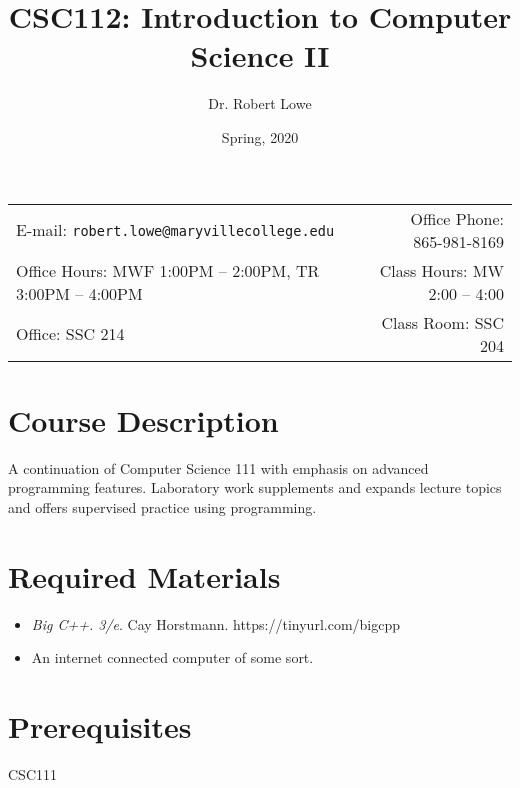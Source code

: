 \documentclass[11pt]{article}
\title{CSC112: Introduction to Computer Science II}
\author{Dr. Robert Lowe}
\date{Spring, 2020}
\newcommand{\blankline}{\quad\pagebreak[2]}
\begin{document}
\maketitle

\blankline

\begin{tabular*}{.93\textwidth}{@{\extracolsep{\fill}}lr}

E-mail: \texttt{robert.lowe@maryvillecollege.edu} & Office Phone: 865-981-8169 \\

 Office Hours: MWF 1:00PM -- 2:00PM, TR 3:00PM -- 4:00PM  &  Class Hours: MW 2:00 -- 4:00\\
 Office: SSC 214 & Class Room: SSC 204\\
\hline
\end{tabular*}

\vspace{5 mm}

\section*{Course Description}
A continuation of Computer Science 111 with emphasis on advanced
programming features. Laboratory work supplements and expands lecture
topics and offers supervised practice using programming. 


\section*{Required Materials}
\begin{itemize}
    \item {\em Big C++. 3/e}. Cay Horstmann.
    https://tinyurl.com/bigcpp
    \item An internet connected computer of some sort.
\end{itemize}

\section*{Prerequisites}
CSC111


\end{document}
